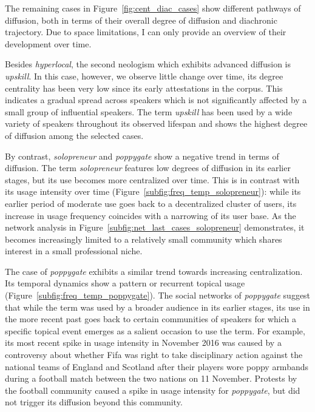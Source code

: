 \documentclass[
  a4paper,
  abstract=on,
  captions=tableabove,
  ]{scrartcl}
\newcommand{\ol}[1]{\emph{#1}}
\begin{document}
      The remaining cases in Figure~\ref{fig:cent_diac_cases} show different pathways of diffusion, both in terms of their overall degree of diffusion and diachronic trajectory. Due to space limitations, I can only provide an overview of their development over time.
      
      Besides \ol{hyperlocal}, the second neologism which exhibits advanced diffusion is \ol{upskill}. In this case, however, we observe little change over time, its degree centrality has been very low since its early attestations in the corpus. This indicates a gradual spread across speakers which is not significantly affected by a small group of influential speakers. The term \ol{upskill} has been used by a wide variety of speakers throughout its observed lifespan and shows the highest degree of diffusion among the selected cases.

      By contrast, \ol{solopreneur} and \ol{poppygate} show a negative trend in terms of diffusion. The term \ol{solopreneur} features low degrees of diffusion in its earlier stages, but its use becomes more centralized over time. This is in contrast with its usage intensity over time (Figure~\ref{subfig:freq_temp_solopreneur}): while its earlier period of moderate use goes back to a decentralized cluster of users, its increase in usage frequency coincides with a narrowing of its user base. As the network analysis in Figure~\ref{subfig:net_last_cases_solopreneur} demonstrates, it becomes increasingly limited to a relatively small community which shares interest in a small professional niche.   

      The case of \ol{poppygate} exhibits a similar trend towards increasing centralization. Its temporal dynamics show a pattern or recurrent topical usage (Figure~\ref{subfig:freq_temp_poppygate}). The social networks of \ol{poppygate} suggest that while the term was used by a broader audience in its earlier stages, its use in the more recent past goes back to certain communities of speakers for which a specific topical event emerges as a salient occasion to use the term. For example, its most recent spike in usage intensity in November 2016 was caused by a controversy about whether Fifa was right to take disciplinary action against the national teams of England and Scotland after their players wore poppy armbands during a football match between the two nations on 11 November. Protests by the football community caused a spike in usage intensity for \ol{poppygate}, but did not trigger its diffusion beyond this community.
\end{document}
